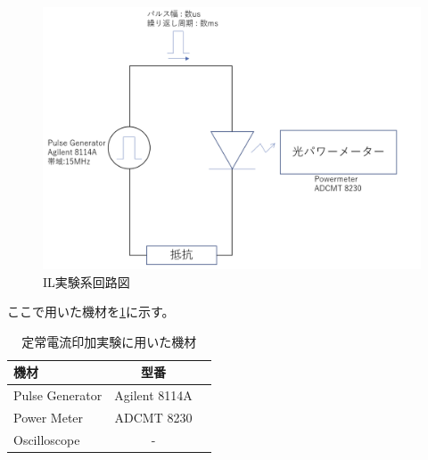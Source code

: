 \begin{figure}[htbp]
	\includegraphics[width=15cm]{figure/fig_2_2_IL_setup.png}
	\caption{IL実験系回路図}
	\label{fig:fig_2_2_IL_setup}
\end{figure}
\clearpage
ここで用いた機材を\ref{table:table_2_2_IL_setup}に示す。
\begin{table}[hbtp]
  \caption{定常電流印加実験に用いた機材}
  \label{table:table_2_2_IL_setup}
  \centering
  \begin{tabular}{lcr}
    \hline
    機材  & 型番     \\
    \hline \hline
    Pulse Generator  & Agilent 8114A   \\
    Power Meter  &  ADCMT 8230    \\
    Oscilloscope  &  -  \\
       \hline
  \end{tabular}
\end{table}
 \clearpage
